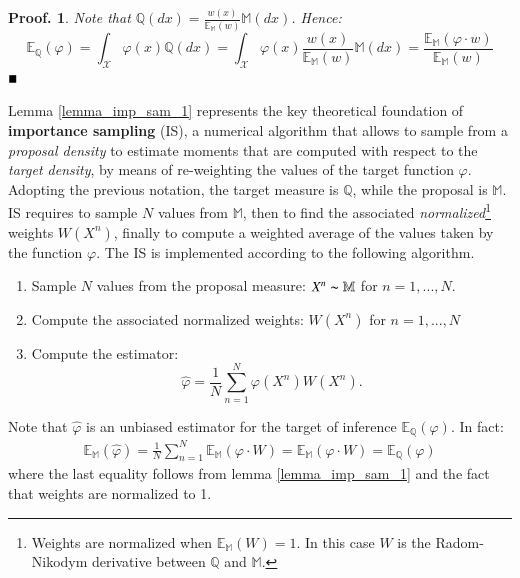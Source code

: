 \documentclass[
]{book}
\theoremstyle{break}
\theoremstyle{nonumberplain}
\newtheorem{proof*}{Proof.}
\begin{document}
\begin{proof*}
Note that $\mathbb Q(dx)=\frac{w(x)}{\mathbb E_\mathbb M(w)}\mathbb M(dx)$. Hence:
\begin{equation*}
    \mathbb E_\mathbb Q(\varphi)=\int_\mathcal X\varphi(x)\mathbb Q(dx)=\int_\mathcal X\varphi(x)\frac{w(x)}{\mathbb E_\mathbb M(w)}\mathbb M(dx)=\frac{\mathbb E_\mathbb M(\varphi \cdot w)}{\mathbb E_\mathbb M(w)}
\end{equation*}
$\hfill\blacksquare$
\end{proof*}

Lemma \ref{lemma_imp_sam_1} represents the key theoretical foundation of
\textbf{importance sampling} (IS), a numerical algorithm that allows to
sample from a \textit{proposal density} to estimate moments that are
computed with respect to the \textit{target density}, by means of
re-weighting the values of the target function \(\varphi\).\\
Adopting the previous notation, the target measure is \(\mathbb Q\),
while the proposal is \(\mathbb M\). IS requires to sample \(N\) values
from \(\mathbb M\), then to find the associated
\textit{normalized}\footnote{Weights are normalized when $\mathbb E_\mathbb M(W)=1$. In this case $W$ is the Radom-Nikodym derivative between $\mathbb Q$ and $\mathbb M$.}
weights \(W(X^n)\), finally to compute a weighted average of the values
taken by the function \(\varphi\). The IS is implemented according to
the following algorithm.

\begin{enumerate}
    \item Sample $N$ values from the proposal measure: $X^n\thicksim \mathbb M$ for $n=1,...,N$.
    \item Compute the associated normalized weights: $W(X^n)$ for $n=1,...,N$
    \item Compute the estimator:
    \begin{equation*}
        \hat \varphi= \frac{1}{N} \sum_{n=1}^N\varphi (X^n)W(X^n).
    \end{equation*}
\end{enumerate}

Note that \(\hat \varphi\) is an unbiased estimator for the target of
inference \(\mathbb E_\mathbb Q(\varphi)\). In fact: \begin{equation*}
    \begin{split}
        \mathbb E_\mathbb M(\hat \varphi)=\frac{1}{N} \sum_{n=1}^N \mathbb E_\mathbb M(\varphi \cdot W)=\mathbb E_\mathbb M(\varphi \cdot W)=\mathbb E_\mathbb Q(\varphi)
    \end{split}
\end{equation*} where the last equality follows from lemma
\ref{lemma_imp_sam_1} and the fact that weights are normalized to 1.
\end{document}
